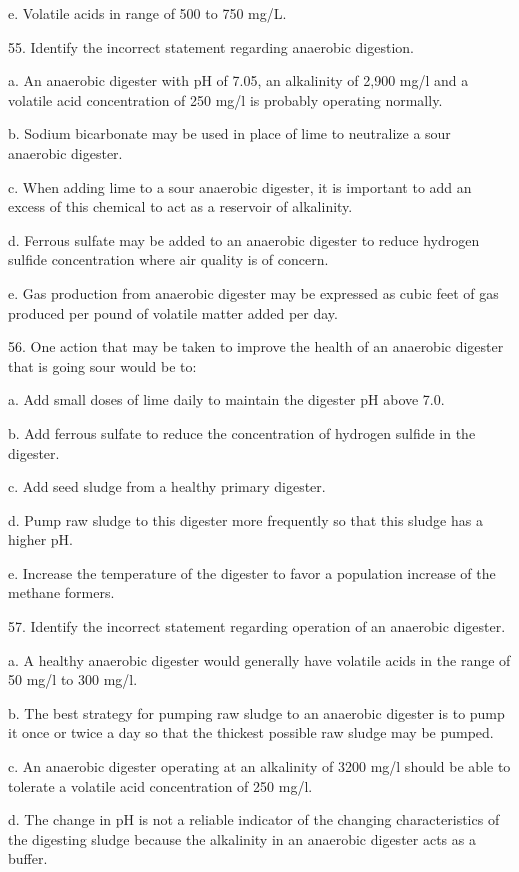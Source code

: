 \documentclass{article}
\begin{document}
e. Volatile acids in range of 500 to 750 mg/L. 


55. Identify the incorrect statement regarding anaerobic digestion. 

a. An anaerobic digester with pH of 7.05, an alkalinity of 2,900 mg/l and a volatile acid concentration of 250 mg/l is probably operating normally. 

b. Sodium bicarbonate may be used in place of lime to neutralize a sour anaerobic digester. 

c. When adding lime to a sour anaerobic digester, it is important to add an excess of this chemical to act as a reservoir of alkalinity. 

d. Ferrous sulfate may be added to an anaerobic digester to reduce hydrogen sulfide concentration where air quality is of concern. 

e. Gas production from anaerobic digester may be expressed as cubic feet of gas produced per pound of volatile matter added per day. 


56. One action that may be taken to improve the health of an anaerobic digester that is going sour would be to: 

a. Add small doses of lime daily to maintain the digester pH above 7.0. 

b. Add ferrous sulfate to reduce the concentration of hydrogen sulfide in the digester. 

c. Add seed sludge from a healthy primary digester. 

d. Pump raw sludge to this digester more frequently so that this sludge has a higher pH. 

e. Increase the temperature of the digester to favor a population increase of the methane formers. 


57. Identify the incorrect statement regarding operation of an anaerobic digester. 

a. A healthy anaerobic digester would generally have volatile acids in the range of 50 mg/l to 300 mg/l. 

b. The best strategy for pumping raw sludge to an anaerobic digester is to pump it once or twice a day so that the thickest possible raw sludge may be pumped. 

c. An anaerobic digester operating at an alkalinity of 3200 mg/l should be able to tolerate a volatile acid concentration of 250 mg/l. 

d. The change in pH is not a reliable indicator of the changing characteristics of the digesting sludge because the alkalinity in an anaerobic digester acts as a buffer. 
\end{document}
